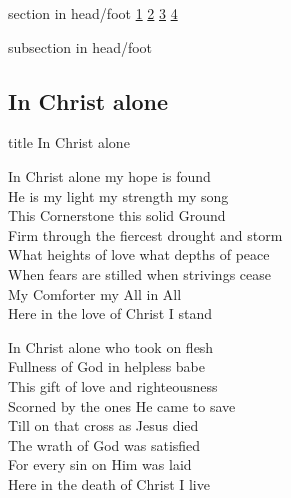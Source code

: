 \documentclass{beamer}
\begin{document}
{
{ 
 {
 \begin{beamercolorbox}[ht=4.5ex,dp=1.5ex,%
      leftskip=.3cm,rightskip=.3cm plus1fil]{section in head/foot}
 \fontsize{12}{25}\selectfont 
\hyperlink{In Christ alone[]1}{1}
\hyperlink{In Christ alone[]2}{2}
\hyperlink{In Christ alone[]3}{3}
\hyperlink{In Christ alone[]4}{4}
 
 \end{beamercolorbox}%
  \begin{beamercolorbox}[ht=2.5ex,dp=1.125ex,%
   leftskip=.3cm,rightskip=.3cm plus1fil]{subsection in head/foot}
   \insertauthor
 \end{beamercolorbox}%
 }
}
\subsection{ In Christ alone }

\hypertarget{In Christ alone[]}{}
\begin{frame}{}
 \vfill
  \centering
  \begin{beamercolorbox}[sep=8pt,center,shadow=true,rounded=true]{title}
    In Christ alone    
  \end{beamercolorbox}
  \vfill
\end{frame}

\hypertarget{In Christ alone[]1}{}
\begin{frame}{}
\fontsize{ 18 }{ 23 }\selectfont

In Christ alone my hope is found\\ 
He is my light my strength my song\\ 
This Cornerstone this solid Ground\\ 
Firm through the fiercest drought and storm\\ 
What heights of love what depths of peace\\ 
When fears are stilled when strivings cease\\ 
My Comforter my All in All\\ 
Here in the love of Christ I stand 

\end{frame}

\hypertarget{In Christ alone[]2}{}
\begin{frame}{}
\fontsize{ 18 }{ 23 }\selectfont

In Christ alone who took on flesh\\ 
Fullness of God in helpless babe\\ 
This gift of love and righteousness\\ 
Scorned by the ones He came to save\\ 
Till on that cross as Jesus died\\ 
The wrath of God was satisfied\\ 
For every sin on Him was laid\\ 
Here in the death of Christ I live 


\end{frame}}
\end{document}
